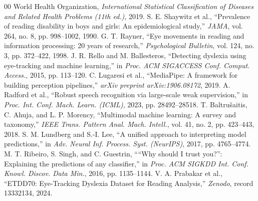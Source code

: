 \documentclass[conference]{IEEEtran}
\begin{document}
\begin{thebibliography}{00}
 World Health Organization, \textit{International Statistical Classification of Diseases and Related Health Problems (11th ed.)}, 2019.
 S. E. Shaywitz et al., ``Prevalence of reading disability in boys and girls: An epidemiological study,'' \textit{JAMA}, vol. 264, no. 8, pp. 998--1002, 1990.
 G. T. Rayner, ``Eye movements in reading and information processing: 20 years of research,'' \textit{Psychological Bulletin}, vol. 124, no. 3, pp. 372--422, 1998.
 J. R. Rello and M. Ballesteros, ``Detecting dyslexia using eye-tracking and machine learning,'' in \textit{Proc. ACM SIGACCESS Conf. Comput. Access.}, 2015, pp. 113--120.
 C. Lugaresi et al., ``MediaPipe: A framework for building perception pipelines,'' \textit{arXiv preprint arXiv:1906.08172}, 2019.
 A. Radford et al., ``Robust speech recognition via large-scale weak supervision,'' in \textit{Proc. Int. Conf. Mach. Learn. (ICML)}, 2023, pp. 28492--28518.
 T. Baltru\v{s}aitis, C. Ahuja, and L. P. Morency, ``Multimodal machine learning: A survey and taxonomy,'' \textit{IEEE Trans. Pattern Anal. Mach. Intell.}, vol. 41, no. 2, pp. 423--443, 2018.
 S. M. Lundberg and S.-I. Lee, ``A unified approach to interpreting model predictions,'' in \textit{Adv. Neural Inf. Process. Syst. (NeurIPS)}, 2017, pp. 4765--4774.
 M. T. Ribeiro, S. Singh, and C. Guestrin, ````Why should I trust you?'': Explaining the predictions of any classifier,'' in \textit{Proc. ACM SIGKDD Int. Conf. Knowl. Discov. Data Min.}, 2016, pp. 1135--1144.
 V. A. Prabakar et al., ``ETDD70: Eye-Tracking Dyslexia Dataset for Reading Analysis,'' \textit{Zenodo}, record 13332134, 2024.
\end{thebibliography}
\end{document}
